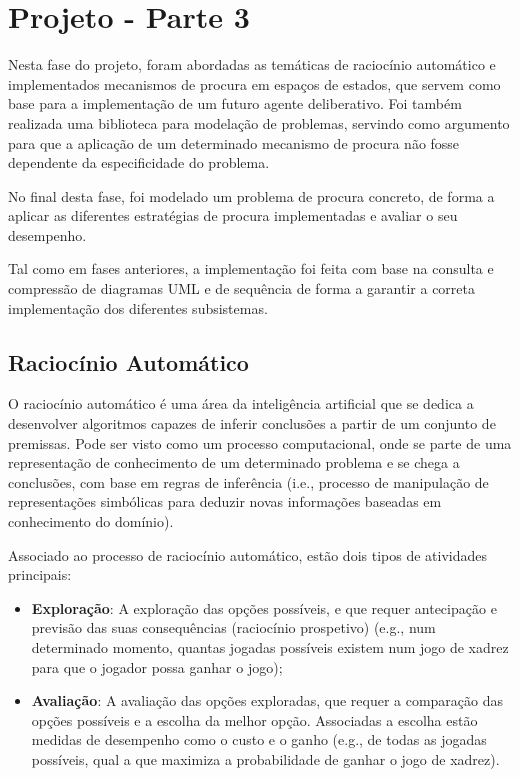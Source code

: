 \chapter{Projeto - Parte 3}\label{ch:projeto-parte3}

Nesta fase do projeto, foram abordadas as temáticas de raciocínio automático e implementados mecanismos de procura em espaços de estados, que servem como base para a implementação de um futuro agente deliberativo.
Foi também realizada uma biblioteca para modelação de problemas, servindo como argumento para que a aplicação de um determinado mecanismo de procura não fosse dependente da especificidade do problema.

No final desta fase, foi modelado um problema de procura concreto, de forma a aplicar as diferentes estratégias de procura implementadas e avaliar o seu desempenho.

Tal como em fases anteriores, a implementação foi feita com base na consulta e compressão de diagramas UML e de sequência de forma a garantir a correta implementação dos diferentes subsistemas.


\section{Raciocínio Automático}\label{sec:raciocinio-automatico}

O raciocínio automático é uma área da inteligência artificial que se dedica a desenvolver algoritmos capazes de inferir conclusões a partir de um conjunto de premissas.
Pode ser visto como um processo computacional, onde se parte de uma representação de conhecimento de um determinado problema e se chega a conclusões, com base em regras de inferência (i.e., processo de manipulação de representações simbólicas para deduzir novas informações baseadas em conhecimento do domínio).

Associado ao processo de raciocínio automático, estão dois tipos de atividades principais:

\begin{itemize}
    \item \textbf{Exploração}: A exploração das opções possíveis, e que requer antecipação e previsão das suas consequências (raciocínio prospetivo) (e.g., num determinado momento, quantas jogadas possíveis existem num jogo de xadrez para que o jogador possa ganhar o jogo);
    \item \textbf{Avaliação}: A avaliação das opções exploradas, que requer a comparação das opções possíveis e a escolha da melhor opção.
    Associadas a escolha estão medidas de desempenho como o custo e o ganho (e.g., de todas as jogadas possíveis, qual a que maximiza a probabilidade de ganhar o jogo de xadrez).
\end{itemize}

